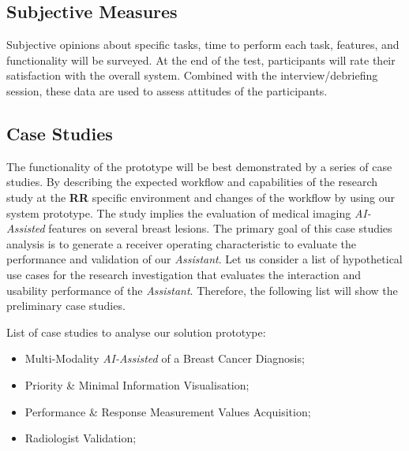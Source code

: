 
\subsection{Subjective Measures}

Subjective opinions about specific tasks, time to perform each task, features, and functionality will be surveyed. At the end of the test, participants will rate their satisfaction with the overall system. Combined with the interview/debriefing session, these data are used to assess attitudes of the participants.



\subsection{Case Studies}

The functionality of the prototype will be best demonstrated by a series of case studies. By describing the expected workflow and capabilities of the research study at the \textbf{RR} specific environment and changes of the workflow by using our system prototype. The study implies the evaluation of medical imaging \textit{AI-Assisted} features on several breast lesions. The primary goal of this case studies analysis is to generate a receiver operating characteristic to evaluate the performance and validation of our \textit{Assistant}. Let us consider a list of hypothetical use cases for the research investigation that evaluates the interaction and usability performance of the \textit{Assistant}. Therefore, the following list will show the preliminary case studies.

\hfill

List of case studies to analyse our solution prototype:

\hfill

\begin{itemize}
\item Multi-Modality \textit{AI-Assisted} of a Breast Cancer Diagnosis;
\item Priority \& Minimal Information Visualisation;
\item Performance \& Response Measurement Values Acquisition;
\item Radiologist Validation;
\end{itemize}


